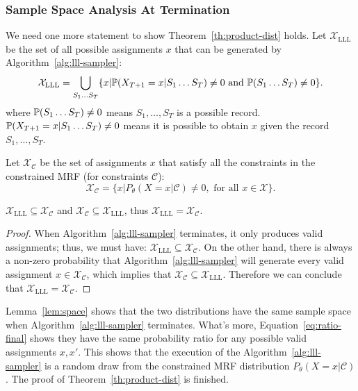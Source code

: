 \subsubsection*{Sample Space Analysis At Termination}
We need one more statement to show Theorem~\ref{th:product-dist} holds. Let
$\mathcal{X}_{\text{LLL}}$ be the set of all possible assignments $x$ that can
be generated by Algorithm~\ref{alg:lll-sampler}:
\begin{equation*}
    \mathcal{X}_{\text{LLL}}=\bigcup_{S_1\ldots S_T}\{x|\mathbb{P}(X_{T+1}=x|S_1\ldots S_T) \neq 0 \text{ and } \mathbb{P}(S_1\ldots S_T)\neq 0\}.
\end{equation*}
{where $ \mathbb{P}(S_1\ldots S_T)\neq 0$ means $S_1,\ldots,S_T$ is a possible record. $\mathbb{P}(X_{T+1}=x|S_1\ldots S_T) \neq 0$ means it is possible to obtain $x$ given the record $S_1,\ldots,S_T$.}

Let $\mathcal{X}_{\mathcal{C}}$ be the set of assignments $x$ that satisfy all
the constraints in the constrained MRF (for constraints $\mathcal{C}$):
\begin{equation*}
    \mathcal{X}_{\mathcal{C}}=\{x|P_{\theta}(X=x|\mathcal{C}) \neq 0, \text{ for all }x\in\mathcal{X}\}.
\end{equation*}

\begin{lemma}\label{lem:space}
    $\mathcal{X}_{\text{LLL}}\subseteq\mathcal{X}_{\mathcal{C}}$ and $\mathcal{X}_{\mathcal{C}}\subseteq\mathcal{X}_{\text{LLL}}$, thus $\mathcal{X}_{\text{LLL}}=\mathcal{X}_{\mathcal{C}}$.
    \begin{proof}
        When Algorithm~\ref{alg:lll-sampler} terminates, it only produces valid assignments; thus, we must have: $\mathcal{X}_{\text{LLL}}\subseteq\mathcal{X}_{\mathcal{C}}$. On the other hand,   there is always a non-zero probability that Algorithm~\ref{alg:lll-sampler} will generate every valid assignment $x\in\mathcal{X}_\mathcal{C}$, which implies that $\mathcal{X}_{\mathcal{C}}\subseteq\mathcal{X}_{\text{LLL}}$. Therefore we can conclude that $\mathcal{X}_{\text{LLL}}=\mathcal{X}_{\mathcal{C}}$.
    \end{proof}
\end{lemma}
Lemma~\ref{lem:space} shows that the two distributions have the same sample space when Algorithm~\ref{alg:lll-sampler} terminates. What's more, Equation~\eqref{eq:ratio-final} shows they have the same probability ratio for any possible valid assignments $x,x'$. This shows that the execution of the Algorithm~\ref{alg:lll-sampler} is a random draw from the constrained MRF distribution $P_{\theta}(X=x|\mathcal{C})$. The proof of Theorem~\ref{th:product-dist} is finished.
